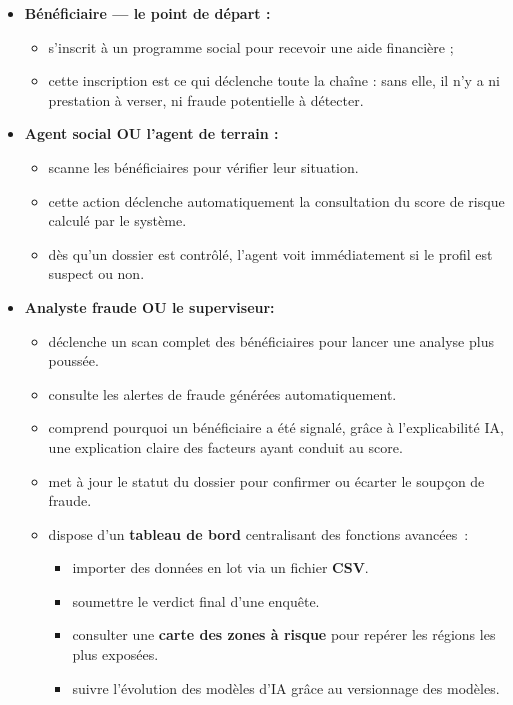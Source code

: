\documentclass[a4paper, oneside, 12pt]{book}
\begin{document}
\begin{itemize}[label=\textbullet]

    \item \textbf{Bénéficiaire — le point de départ :}
    \begin{itemize}[label=\textendash]
        \item s'inscrit à un programme social pour recevoir une aide financière ;
        \item cette inscription est ce qui déclenche toute la chaîne : sans elle, il n'y a ni prestation à verser, ni fraude potentielle à détecter.
    \end{itemize}

    \item \textbf{Agent social OU l'agent de terrain :}
    \begin{itemize}[label=\textendash]
        \item scanne les bénéficiaires pour vérifier leur situation.
        \item cette action déclenche automatiquement la consultation du score de risque calculé par le système.
        \item dès qu'un dossier est contrôlé, l'agent voit immédiatement si le profil est suspect ou non.
    \end{itemize}

    \item \textbf{Analyste fraude OU le superviseur:}
    \begin{itemize}[label=\textendash]
        \item déclenche un scan complet des bénéficiaires pour lancer une analyse plus poussée.
        \item consulte les alertes de fraude générées automatiquement.
        \item comprend pourquoi un bénéficiaire a été signalé, grâce à l'explicabilité IA, une explication claire des facteurs ayant conduit au score.
        \item met à jour le statut du dossier pour confirmer ou écarter le soupçon de fraude.
        \item dispose d'un \textbf{tableau de bord} centralisant des fonctions avancées~:
        \begin{itemize}[label=$\ast$]
            \item importer des données en lot via un fichier \textbf{CSV}.
            \item soumettre le verdict final d'une enquête.
            \item consulter une \textbf{carte des zones à risque} pour repérer les régions les plus exposées.
            \item suivre l'évolution des modèles d'IA grâce au versionnage des modèles.
        \end{itemize}
    \end{itemize}


\end{itemize}
\end{document}
